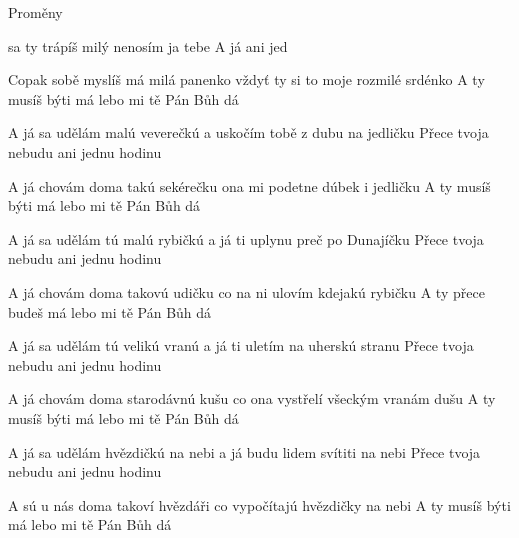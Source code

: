 \begin{TEXT}{Proměny}

\SLOKA* {} sa ty trápíš  milý \NL
nenosím ja tebe  \NL
A já     ani jed 

\SLOKA* Copak sobě myslíš má milá panenko\NL
vždyť ty si to moje rozmilé srdénko\NL
A ty musíš býti má lebo mi tě Pán Bůh dá

\SLOKA* A já sa udělám malú veverečkú\NL
a uskočím tobě z dubu na jedličku\NL
Přece tvoja nebudu ani jednu hodinu

\SLOKA* A já chovám doma takú sekérečku\NL
ona mi podetne dúbek i jedličku\NL
 A ty musíš býti má lebo mi tě Pán Bůh dá

\SLOKA* A já sa udělám tú malú rybičkú\NL
a já ti uplynu preč po Dunajíčku\NL
Přece tvoja nebudu ani jednu hodinu

\SLOKA* A já chovám doma takovú udičku\NL
co na ni ulovím kdejakú rybičku\NL
A ty přece budeš má lebo mi tě Pán Bůh dá

\SLOKA* A já sa udělám tú velikú vranú\NL
a já ti uletím na uherskú stranu\NL
Přece tvoja nebudu ani jednu hodinu

\SLOKA* A já chovám doma starodávnú kušu\NL
co ona vystřelí všeckým vranám dušu\NL
A ty musíš býti má lebo mi tě Pán Bůh dá

\SLOKA* A já sa udělám hvězdičkú na nebi\NL
a já budu lidem svítiti na nebi\NL
Přece tvoja nebudu ani jednu hodinu

\SLOKA* A sú u nás doma takoví hvězdáři\NL
co vypočítajú hvězdičky na nebi\NL
A ty musíš býti má lebo mi tě Pán Bůh dá
\end{TEXT}
